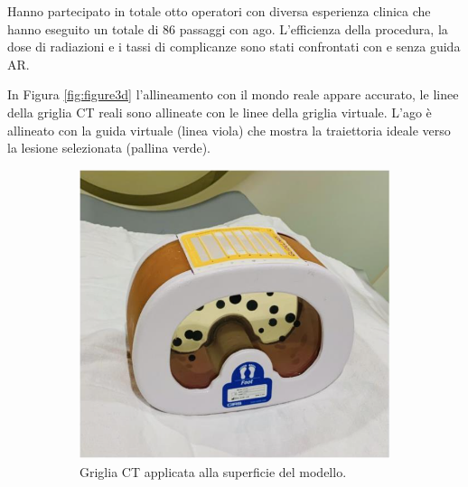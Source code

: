 Hanno partecipato in totale otto operatori con diversa esperienza clinica che hanno eseguito un totale di 86 passaggi con ago. L'efficienza della procedura, la dose di radiazioni e i tassi di complicanze sono stati confrontati con e senza guida AR.

In Figura \ref{fig:figure3d} l'allineamento con il mondo reale appare accurato, le linee della griglia CT reali sono allineate con le linee della griglia virtuale. L'ago è allineato con la guida virtuale (linea viola) che mostra la traiettoria ideale verso la lesione selezionata (pallina verde).

\begin{figure}[t]
    \centering
    \begin{subfigure}{0.45\textwidth}
        \centering
        \includegraphics[width=\textwidth]{images/phantom.png}
        \caption{Griglia CT applicata alla superficie del modello.}
        \label{fig:figure3a}
    \end{subfigure}
    \begin{subfigure}{0.45\textwidth}
        \centering

\end{subfigure}
\end{figure}
